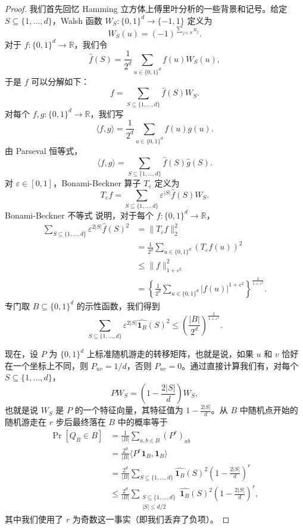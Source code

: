 \documentclass[10pt,twocolumn]{ctexart}
\begin{document}
\begin{proof}
我们首先回忆 Hamming 立方体上傅里叶分析的一些背景和记号。给定 $S\subseteq\{1,\ldots,d\}$，Walsh 函数 $W_S:\{0,1\}^d\to\{-1,1\}$ 定义为
\[
W_S(u)=(-1)^{\sum_{j\in S}u_j}.
\]
对于 $f:\{0,1\}^d\to\mathbb{R}$，我们令
\[
\widehat f(S)=\frac{1}{2^d}\sum_{u\in\{0,1\}^d}f(u)W_S(u),
\]
于是 $f$ 可以分解如下：
\[
f=\sum_{S\subseteq\{1,\ldots,d\}}\widehat f(S)W_S.
\]
对每个 $f,g:\{0,1\}^d\to\mathbb{R}$，我们写
\[
\langle f,g\rangle=\frac{1}{2^d}\sum_{u\in\{0,1\}^d}f(u)g(u).
\]
由 Parseval 恒等式，
\[
\langle f,g\rangle
=
\sum_{S\subseteq\{1,\ldots,d\}}\widehat f(S)\widehat g(S).
\]
对 $\varepsilon\in[0,1]$，Bonami-Beckner 算子 $T_\varepsilon$ 定义为
\[
T_\varepsilon f=
\sum_{S\subseteq\{1,\ldots,d\}}\varepsilon^{|S|}\widehat f(S)W_S.
\]
Bonami-Beckner 不等式 \cite{Bon70,Bec75} 说明，对于每个 $f:\{0,1\}^d\to\mathbb{R}$，
\[
\begin{aligned}
\sum_{S\subseteq\{1,\ldots,d\}}\varepsilon^{2|S|}\widehat f(S)^2
&=\|T_\varepsilon f\|_2^2\\
&=\frac{1}{2^d}\sum_{u\in\{0,1\}^d}(T_\varepsilon f(u))^2\\
&\le \|f\|_{1+\varepsilon^2}^2\\
&=\left\{\frac{1}{2^d}
\sum_{u\in\{0,1\}^d}|f(u)|^{1+\varepsilon^2}
\right\}^{\frac{2}{1+\varepsilon^2}}.
\end{aligned}
\]
专门取 $B\subseteq\{0,1\}^d$ 的示性函数，我们得到
\begin{equation}
\sum_{S\subseteq\{1,\ldots,d\}}\varepsilon^{2|S|}
\widehat{\mathbf{1}_B}(S)^2
\le
\left(\frac{|B|}{2^d}\right)^{\frac{2}{1+\varepsilon^2}}.
\end{equation}

现在，设 $P$ 为 $\{0,1\}^d$ 上标准随机游走的转移矩阵，也就是说，如果 $u$ 和 $v$ 恰好在一个坐标上不同，则 $P_{uv}=1/d$，否则 $P_{uv}=0$。通过直接计算我们有，对每个 $S\subseteq\{1,\ldots,d\}$，
\[
P W_S=\left(1-\frac{2|S|}{d}\right)W_S,
\]
也就是说 $W_S$ 是 $P$ 的一个特征向量，其特征值为 $1-\frac{2|S|}{d}$。从 $B$ 中随机点开始的随机游走在 $r$ 步后最终落在 $B$ 中的概率等于
\[
\begin{aligned}
\Pr[Q_B\in B]
&=\frac{1}{|B|}\sum_{a,b\in B}(P^r)_{ab}\\
&=\frac{2^d}{|B|}\langle P^r\mathbf{1}_B,\mathbf{1}_B\rangle\\
&=\frac{2^d}{|B|}
\sum_{S\subseteq\{1,\ldots,d\}}
\widehat{\mathbf{1}_B}(S)^2
\left(1-\frac{2|S|}{d}\right)^r\\
&\le
\frac{2^d}{|B|}
\sum_{\substack{S\subseteq\{1,\ldots,d\}\\ |S|\le d/2}}
\widehat{\mathbf{1}_B}(S)^2
\left(1-\frac{2|S|}{d}\right)^r,
\end{aligned}
\]
其中我们使用了 $r$ 为奇数这一事实（即我们丢弃了负项）。


\end{proof}
\end{document}
